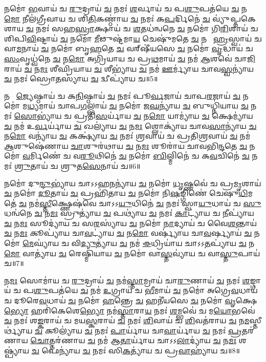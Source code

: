 𑌨𑌮𑍋॑ \ul{𑌭}𑌵𑌾𑌯॑ 𑌚 \ul{𑌰𑍁}𑌦𑍍𑌰𑌾𑌯॑ \ul{𑌚} 𑌨𑌮𑌃॑ \ul{𑌶}𑌰𑍍𑌵𑌾𑌯॑ 𑌚 𑌪\ul{𑌶𑍁}𑌪𑌤॑𑌯𑍇 \ul{𑌚} 𑌨\ul{𑌮𑍋} 𑌨𑍀𑌲॑𑌗𑍍𑌰𑍀𑌵𑌾𑌯 𑌚 𑌶𑌿\ul{𑌤𑌿}𑌕𑌣𑍍𑌠𑌾॑𑌯 \ul{𑌚} 𑌨𑌮𑌃॑ 𑌕\ul{𑌪}𑌰𑍍𑌦𑌿𑌨𑍇॑ \ul{𑌚} 𑌵𑍍𑌯𑍁॑𑌪𑍍𑌤𑌕𑍇𑌶𑌾𑌯 \ul{𑌚} 𑌨𑌮𑌃॑ 𑌸𑌹\ul{𑌸𑍍𑌰𑌾}𑌕𑍍𑌷𑌾𑌯॑ 𑌚 \ul{𑌶}𑌤𑌧॑𑌨𑍍𑌵𑌨𑍇 \ul{𑌚} 𑌨𑌮𑍋॑ 𑌗𑌿\ul{𑌰𑌿}𑌶𑌾𑌯॑ 𑌚 𑌶𑌿𑌪𑌿\ul{𑌵𑌿}𑌷𑍍𑌟𑌾𑌯॑ \ul{𑌚} 𑌨𑌮𑍋॑ \ul{𑌮𑍀}𑌢𑍁𑌷𑍍𑌟॑𑌮𑌾\ul{𑌯} 𑌚𑍇𑌷𑍁॑𑌮𑌤𑍇 \ul{𑌚} 𑌨𑌮𑍋᳚ \ul{𑌹𑍍𑌰}𑌸𑍍𑌵𑌾𑌯॑ 𑌚 𑌵𑌾\ul{𑌮}𑌨𑌾𑌯॑ \ul{𑌚} 𑌨𑌮𑍋॑ 𑌬𑍃\ul{𑌹}𑌤𑍇 \ul{𑌚} 𑌵𑌰𑍍‌𑌷𑍀॑𑌯𑌸𑍇 \ul{𑌚} 𑌨𑌮𑍋॑ \ul{𑌵𑍃}𑌦𑍍𑌧𑌾𑌯॑ 𑌚 \ul{𑌸𑌂}𑌵𑍃𑌧𑍍𑌵॑𑌨𑍇 \ul{𑌚} 𑌨\ul{𑌮𑍋} 𑌅𑌗𑍍𑌰𑌿॑𑌯𑌾𑌯 𑌚 𑌪𑍍𑌰\ul{𑌥}𑌮𑌾𑌯॑ \ul{𑌚} 𑌨𑌮॑ \ul{𑌆}𑌶𑌵𑍇॑ 𑌚𑌾\ul{𑌜𑌿}𑌰𑌾𑌯॑ \ul{𑌚} 𑌨\ul{𑌮𑌃} 𑌶𑍀𑌘𑍍𑌰𑌿॑𑌯𑌾𑌯 \ul{𑌚} 𑌶𑍀𑌭𑍍𑌯𑌾॑𑌯 \ul{𑌚} 𑌨𑌮॑ \ul{𑌊}𑌰𑍍𑌮𑍍𑌯𑌾॑𑌯 𑌚𑌾𑌵\ul{𑌸𑍍𑌵}𑌨𑍍𑌯𑌾॑𑌯 \ul{𑌚} 𑌨𑌮𑌃॑ 𑌸𑍍𑌰𑍋\ul{𑌤}𑌸𑍍𑌯𑌾॑𑌯 \ul{𑌚} 𑌦𑍍𑌵𑍀𑌪𑍍𑌯𑌾॑𑌯 𑌚॥5॥ 

𑌨𑌮𑍋᳚ \ul{𑌜𑍍𑌯𑍇}𑌷𑍍𑌠𑌾𑌯॑ 𑌚 𑌕\ul{𑌨𑌿}𑌷𑍍𑌠𑌾𑌯॑ \ul{𑌚} 𑌨𑌮𑌃॑ 𑌪𑍂\ul{𑌰𑍍𑌵}𑌜𑌾𑌯॑ 𑌚𑌾𑌪\ul{𑌰}𑌜𑌾𑌯॑ \ul{𑌚} 𑌨𑌮𑍋॑ 𑌮\ul{𑌧𑍍𑌯}𑌮𑌾𑌯॑ 𑌚𑌾𑌪\ul{𑌗}𑌲𑍍𑌭𑌾𑌯॑ \ul{𑌚} 𑌨𑌮𑍋॑ 𑌜\ul{𑌘}𑌨𑍍𑌯𑌾॑𑌯 \ul{𑌚} 𑌬𑍁𑌧𑍍𑌨𑌿॑𑌯𑌾𑌯 \ul{𑌚} 𑌨𑌮𑌃॑ \ul{𑌸𑍋}𑌭𑍍𑌯𑌾॑𑌯 𑌚 𑌪𑍍𑌰𑌤𑌿\ul{𑌸}𑌰𑍍𑌯𑌾॑𑌯 \ul{𑌚} 𑌨\ul{𑌮𑍋} 𑌯𑌾𑌮𑍍𑌯𑌾॑𑌯 \ul{𑌚} 𑌕𑍍𑌷𑍇𑌮𑍍𑌯𑌾॑𑌯 \ul{𑌚} 𑌨𑌮॑ 𑌉\ul{𑌰𑍍𑌵}𑌰𑍍𑌯𑌾॑𑌯 \ul{𑌚} 𑌖𑌲𑍍𑌯𑌾॑𑌯 \ul{𑌚} 𑌨\ul{𑌮𑌃} 𑌶𑍍𑌲𑍋𑌕𑍍𑌯𑌾॑𑌯 𑌚𑌾𑌵\ul{𑌸𑌾}𑌨𑍍𑌯𑌾॑𑌯 \ul{𑌚} 𑌨\ul{𑌮𑍋} 𑌵𑌨𑍍𑌯𑌾॑𑌯 \ul{𑌚} 𑌕𑌕𑍍𑌷𑍍𑌯𑌾॑𑌯 \ul{𑌚} 𑌨𑌮𑌃॑ \ul{𑌶𑍍𑌰}𑌵𑌾𑌯॑ 𑌚 𑌪𑍍𑌰𑌤𑌿\ul{𑌶𑍍𑌰}𑌵𑌾𑌯॑ \ul{𑌚} 𑌨𑌮॑ \ul{𑌆}𑌶𑍁𑌷𑍇॑𑌣𑌾𑌯 \ul{𑌚𑌾}𑌶𑍁𑌰॑𑌥𑌾𑌯 \ul{𑌚} 𑌨\ul{𑌮𑌃} 𑌶𑍂𑌰𑌾॑𑌯 𑌚𑌾𑌵𑌭𑌿\ul{𑌨𑍍𑌦}𑌤𑍇 \ul{𑌚} 𑌨𑌮𑍋॑ \ul{𑌵}𑌰𑍍𑌮𑌿𑌣𑍇॑ 𑌚 𑌵\ul{𑌰𑍂}𑌥𑌿𑌨𑍇॑ \ul{𑌚} 𑌨𑌮𑍋॑ \ul{𑌬𑌿}𑌲𑍍𑌮𑌿𑌨𑍇॑ 𑌚 𑌕\ul{𑌵}𑌚𑌿𑌨𑍇॑ \ul{𑌚} 𑌨𑌮𑌃॑ \ul{𑌶𑍍𑌰𑍁}𑌤𑌾𑌯॑ 𑌚 𑌶𑍍𑌰𑍁𑌤\ul{𑌸𑍇}𑌨𑌾𑌯॑ 𑌚॥6॥ 

𑌨𑌮𑍋॑ 𑌦𑍁\ul{𑌨𑍍𑌦𑍁}𑌭𑍍𑌯𑌾॑𑌯 𑌚𑌾𑌽𑌽𑌹\ul{𑌨}𑌨𑍍𑌯𑌾॑𑌯 \ul{𑌚} 𑌨𑌮𑍋॑ \ul{𑌧𑍃}𑌷𑍍𑌣𑌵𑍇॑ 𑌚 𑌪𑍍𑌰\ul{𑌮𑍃}𑌶𑌾𑌯॑ \ul{𑌚} 𑌨𑌮𑍋॑ \ul{𑌦𑍂}𑌤𑌾𑌯॑ \ul{𑌚} 𑌪𑍍𑌰𑌹𑌿॑𑌤𑌾𑌯 \ul{𑌚} 𑌨𑌮𑍋॑ 𑌨𑌿\ul{𑌷}𑌙𑍍𑌗𑌿𑌣𑍇॑ 𑌚𑍇𑌷𑍁\ul{𑌧𑌿}𑌮𑌤𑍇॑ \ul{𑌚} 𑌨𑌮॑\ul{𑌸𑍍𑌤𑍀}𑌕𑍍𑌷𑍍𑌣𑍇𑌷॑𑌵𑍇 𑌚𑌾𑌽𑌽\ul{𑌯𑍁}𑌧𑌿𑌨𑍇॑ \ul{𑌚} 𑌨𑌮𑌃॑ 𑌸𑍍𑌵𑌾\ul{𑌯𑍁}𑌧𑌾𑌯॑ 𑌚 \ul{𑌸𑍁}𑌧𑌨𑍍𑌵॑𑌨𑍇 \ul{𑌚} 𑌨\ul{𑌮𑌃} 𑌸𑍍𑌰𑍁𑌤𑍍𑌯𑌾॑𑌯 \ul{𑌚} 𑌪𑌥𑍍𑌯𑌾॑𑌯 \ul{𑌚} 𑌨𑌮𑌃॑ \ul{𑌕𑌾}𑌟𑍍𑌯𑌾॑𑌯 𑌚 \ul{𑌨𑍀}𑌪𑍍𑌯𑌾॑𑌯 \ul{𑌚} 𑌨\ul{𑌮𑌃} 𑌸𑍂𑌦𑍍𑌯𑌾॑𑌯 𑌚 𑌸\ul{𑌰}𑌸𑍍𑌯𑌾॑𑌯 \ul{𑌚} 𑌨𑌮𑍋॑ \ul{𑌨𑌾}𑌦𑍍𑌯𑌾𑌯॑ 𑌚 𑌵𑍈\ul{𑌶}𑌨𑍍𑌤𑌾𑌯॑ \ul{𑌚} 𑌨\ul{𑌮𑌃} 𑌕𑍂𑌪𑍍𑌯𑌾॑𑌯 𑌚𑌾\ul{𑌵}𑌟𑍍𑌯𑌾॑𑌯 \ul{𑌚} 𑌨\ul{𑌮𑍋} 𑌵𑌰𑍍𑌷𑍍𑌯𑌾॑𑌯 𑌚𑌾\ul{𑌵}𑌰𑍍𑌷𑍍𑌯𑌾𑌯॑ \ul{𑌚} 𑌨𑌮𑍋॑ \ul{𑌮𑍇}𑌘𑍍𑌯𑌾॑𑌯 𑌚 𑌵𑌿\ul{𑌦𑍍𑌯𑍁}𑌤𑍍𑌯𑌾॑𑌯 \ul{𑌚} 𑌨𑌮॑ \ul{𑌈}𑌧𑍍𑌰𑌿𑌯𑌾॑𑌯 𑌚𑌾𑌽𑌽\ul{𑌤}𑌪𑍍𑌯𑌾॑𑌯 \ul{𑌚} 𑌨\ul{𑌮𑍋} 𑌵𑌾𑌤𑍍𑌯𑌾॑𑌯 \ul{𑌚} 𑌰𑍇𑌷𑍍𑌮𑌿॑𑌯𑌾𑌯 \ul{𑌚} 𑌨𑌮𑍋॑ 𑌵𑌾\ul{𑌸𑍍𑌤}𑌵𑍍𑌯𑌾॑𑌯 𑌚 𑌵𑌾\ul{𑌸𑍍𑌤𑍁}𑌪𑌾𑌯॑ 𑌚॥7॥ 

𑌨\ul{𑌮𑌃} 𑌸𑍋𑌮𑌾॑𑌯 𑌚 \ul{𑌰𑍁}𑌦𑍍𑌰𑌾𑌯॑ \ul{𑌚} 𑌨𑌮॑\ul{𑌸𑍍𑌤𑌾}𑌮𑍍𑌰𑌾𑌯॑ 𑌚𑌾\ul{𑌰𑍁}𑌣𑌾𑌯॑ \ul{𑌚} 𑌨𑌮𑌃॑ \ul{𑌶}𑌙𑍍𑌗𑌾𑌯॑ 𑌚 𑌪\ul{𑌶𑍁}𑌪𑌤॑𑌯𑍇 \ul{𑌚} 𑌨𑌮॑ \ul{𑌉}𑌗𑍍𑌰𑌾𑌯॑ 𑌚 \ul{𑌭𑍀}𑌮𑌾𑌯॑ \ul{𑌚} 𑌨𑌮𑍋॑ 𑌅𑌗𑍍𑌰𑍇\ul{𑌵}𑌧𑌾𑌯॑ 𑌚 𑌦𑍂𑌰𑍇\ul{𑌵}𑌧𑌾𑌯॑ \ul{𑌚} 𑌨𑌮𑍋॑ \ul{𑌹}𑌨𑍍𑌤𑍍𑌰𑍇 \ul{𑌚} 𑌹𑌨𑍀॑𑌯𑌸𑍇 \ul{𑌚} 𑌨𑌮𑍋॑ \ul{𑌵𑍃}𑌕𑍍𑌷𑍇\ul{𑌭𑍍𑌯𑍋} 𑌹𑌰𑌿॑𑌕𑍇𑌶𑍇\ul{𑌭𑍍𑌯𑍋} 𑌨𑌮॑\ul{𑌸𑍍𑌤𑌾}𑌰𑌾\ul{𑌯} 𑌨𑌮𑌃॑  \ul{𑌶}𑌮𑍍𑌭𑌵𑍇॑ 𑌚 𑌮\ul{𑌯𑍋}𑌭𑌵𑍇॑ \ul{𑌚} 𑌨𑌮𑌃॑ 𑌶\ul{𑌙𑍍𑌕}𑌰𑌾𑌯॑ 𑌚 𑌮𑌯\ul{𑌸𑍍𑌕}𑌰𑌾𑌯॑ \ul{𑌚} 𑌨𑌮𑌃॑ \ul{𑌶𑌿}𑌵𑌾𑌯॑ 𑌚 \ul{𑌶𑌿}𑌵𑌤॑𑌰𑌾𑌯 \ul{𑌚} 𑌨\ul{𑌮}𑌸𑍍𑌤𑍀𑌰𑍍𑌥𑍍𑌯𑌾॑𑌯 \ul{𑌚} 𑌕𑍂𑌲𑍍𑌯𑌾॑𑌯 \ul{𑌚} 𑌨𑌮𑌃॑ \ul{𑌪𑌾}𑌰𑍍𑌯𑌾॑𑌯 𑌚𑌾\ul{𑌵𑌾}𑌰𑍍𑌯𑌾॑𑌯 \ul{𑌚} 𑌨𑌮𑌃॑ \ul{𑌪𑍍𑌰}𑌤𑌰॑𑌣𑌾𑌯 \ul{𑌚𑍋}𑌤𑍍𑌤𑌰॑𑌣𑌾𑌯 \ul{𑌚} 𑌨𑌮॑ 𑌆\ul{𑌤𑌾}𑌰𑍍𑌯𑌾॑𑌯 𑌚𑌾𑌽𑌽\ul{𑌲𑌾}𑌦𑍍𑌯𑌾॑𑌯 \ul{𑌚} 𑌨\ul{𑌮𑌃} 𑌶𑌷𑍍𑌪𑍍𑌯𑌾॑𑌯 \ul{𑌚} 𑌫𑍇𑌨𑍍𑌯𑌾॑𑌯 \ul{𑌚} 𑌨𑌮𑌃॑ 𑌸𑌿\ul{𑌕}𑌤𑍍𑌯𑌾॑𑌯 𑌚 𑌪𑍍𑌰\ul{𑌵𑌾}𑌹𑍍𑌯𑌾॑𑌯 𑌚॥8॥ 

